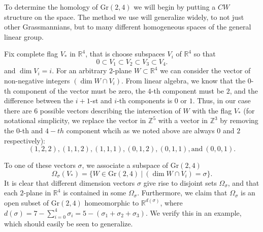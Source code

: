 \documentclass{amsart}          %
\newcommand{\Gr}{\mathrm{Gr}}
\begin{document}
To determine the homology of $\Gr(2, 4)$ we will begin by putting a $CW$ structure on the space. The method we use will generalize widely, to not just other Grassmannians, but to many different homogeneous spaces of the general linear group. 

Fix complete flag $V_{\ast}$ in $\mathbb{R}^4$, that is choose subspaces $V_i$ of $\mathbb{R}^4$ so that 
\[
0 \subset V_1\subset V_2\subset V_3\subset V_4.
\]
and $\dim V_i = i$. For an arbitrary $2$-plane $W\subset \mathbb{R}^4$ we can consider the vector of non-negative integers $(\dim W\cap V_i)$. From linear algebra, we know that the $0$-th component of the vector must be zero, the $4$-th component must be $2$, and the difference between the $i+1$-st and $i$-th components is $0$ or $1$. Thus, in our case there are $6$ possible vectors describing the intersection of $W$ with the flag $V_{\ast}$ (for notational simplicity, we replace the vector in $\mathbb{Z}^5$ with a vector in $\mathbb{Z}^3$ by removing the $0$-th and $4-th$ component whcih as we noted above are always $0$ and $2$ respectively):
\[
(1, 2, 2), (1, 1, 2), (1, 1, 1), (0, 1, 2), (0, 1, 1), \text{and} \ (0, 0, 1).
\]

To one of these vectors $\sigma$, we associate a subspace of $\Gr(2, 4)$ 
\[
\Omega_{\sigma}(V_{\ast}) = \lbrace W\in \Gr(2, 4) \ | \ (\dim W\cap V_i) = \sigma\rbrace.
\]
It is clear that different dimension vectors $\sigma$ give rise to disjoint sets $\Omega_{\sigma}$, and that each $2$-plane in $\mathbb{R}^4$ is contained in some $\Omega_{\sigma}$. Furthermore, we claim that $\Omega_{\sigma}$ is an open subset of $\Gr(2, 4)$ homeomorphic to $\mathbb{R}^{d(\sigma)}$, where $d(\sigma) = 7- \sum_{i=0}^4\sigma_i = 5- (\sigma_1+ \sigma_2+ \sigma_3)$. We verify this in an example, which should easily be seen to generalize. 
\end{document}
